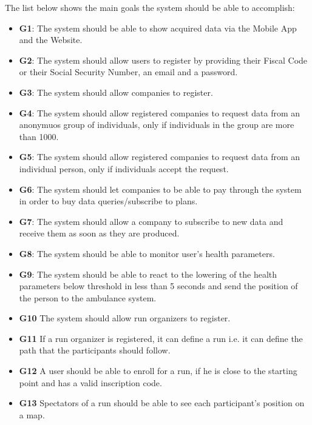 The list below shows the main goals the system should be able to accomplish:

\begin{itemize}
    \item \textbf{G1}: The system should be able to show acquired data via the Mobile App and the Website.
    \item \textbf{G2}: The system should allow users to register by providing their Fiscal Code or their Social Security Number, an email and a password.
    \item \textbf{G3}: The system should allow companies to register.
    \item \textbf{G4}: The system should allow registered companies to request data from an anonymuos group of individuals, only if individuals in the group are more than 1000.
    \item \textbf{G5}: The system should allow registered companies to request data from an individual person, only if individuals accept the request.

    \item \textbf{G6}: The system should let companies to be able to pay through the system in order to buy data queries/subscribe to plans.

    \item \textbf{G7}: The system should allow a company to subscribe to new data and receive them as soon as they are produced.
    \item \textbf{G8}: The system should be able to monitor user's health parameters.
    \item \textbf{G9}: The system should be able to react to the lowering of the health parameters below threshold in less than 5 seconds and send the position of the person to the ambulance system. 
    
    \item \textbf{G10} The system should allow run organizers to register.
    \item \textbf{G11} If a run organizer is registered, it can define a run i.e. it can define the path that the participants should follow.
    \item \textbf{G12} A user should be able to enroll for a run, if he is close to the starting point and has a valid inscription code.
    \item \textbf{G13} Spectators of a run should be able to see each participant's position on a map.
\end{itemize}





